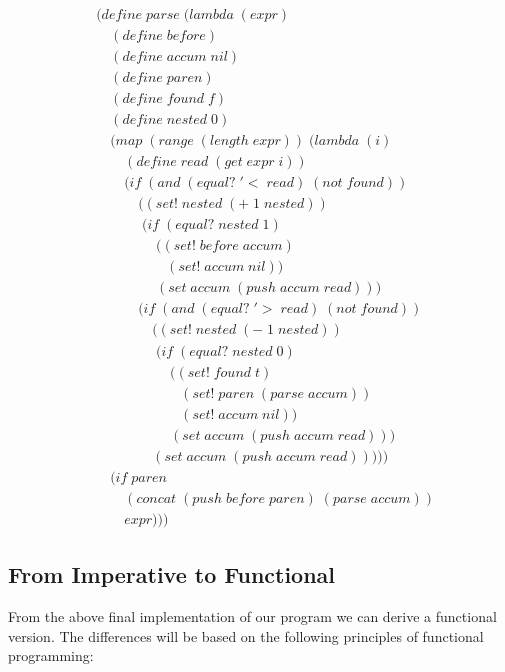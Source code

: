 \begin{align*}
& (define \; parse \; (lambda \; (expr) \; 
\\& \quad (define \; before)
\\& \quad (define \; accum \; nil)
\\& \quad (define \; paren)
\\& \quad (define \; found \; f)
\\& \quad (define \; nested \; 0)
\\& \quad (map \; (range \; (length \; expr)) \; (lambda \; (i)
\\& \qquad (define \; read \; (get \; expr \; i))
\\& \qquad (if \; (and \; (equal? \; '< \; read) \; (not \; found))
\\& \qquad \quad ((set! \; nested \; (+ \; 1 \; nested))
\\& \qquad \quad \; (if \; (equal? \; nested \; 1)
\\& \qquad \qquad \; ((set! \; before \; accum)
\\& \qquad \qquad \quad (set! \; accum \; nil))
\\& \qquad \qquad \; (set \; accum \; (push \; accum \; read)))
\\& \qquad \quad (if \; (and \; (equal? \; '> \; read) \; (not \; found))
\\& \qquad \qquad ((set! \; nested \; (- \; 1 \; nested))
\\& \qquad \qquad \; (if \; (equal? \; nested \; 0)
\\& \qquad \qquad \quad \; ((set! \; found \; t)
\\& \qquad \qquad \qquad (set! \; paren \; (parse \; accum))
\\& \qquad \qquad \qquad (set! \; accum \; nil))
\\& \qquad \qquad \quad \; (set \; accum \; (push \; accum \; read)))
\\& \qquad \qquad (set \; accum \; (push \; accum \; read)))))
\\& \quad (if \; paren
\\& \qquad (concat \; (push \; before \; paren) \; (parse \; accum))
\\& \qquad expr)))
\end{align*}

\subsection{From Imperative to Functional}
From the above final implementation of our program we can derive a functional 
version. The differences will be based on the following principles of functional 
programming:

